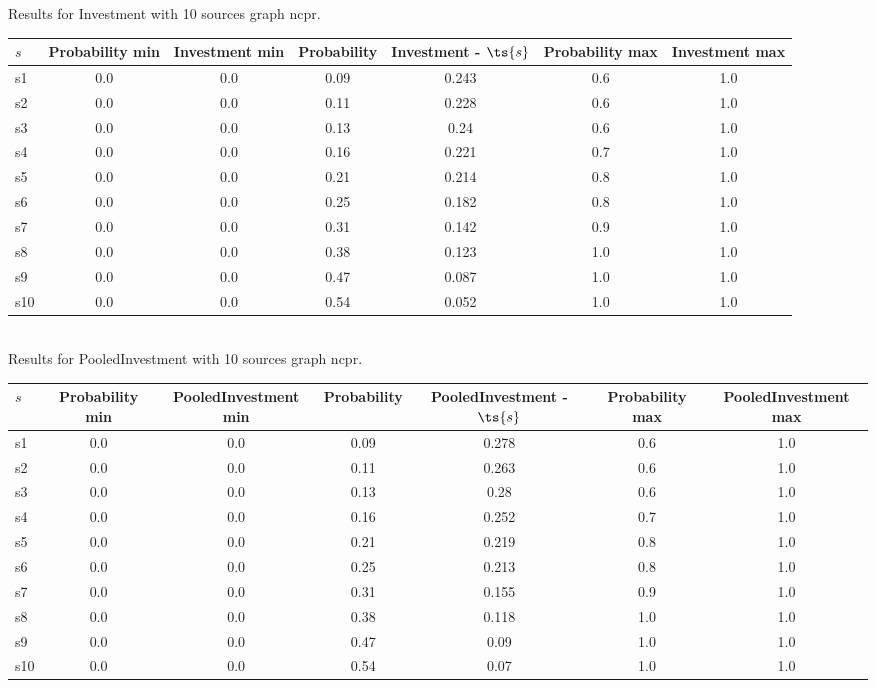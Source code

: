 \documentclass{article}
\begin{document}
\noindent Results for Investment with 10 sources graph ncpr.

\noindent\begin{tabular}{|l|c|c|c|c|c|c|}
\hline
$s$& Probability min & Investment min & Probability & Investment - $\ts{s}$ & Probability max & Investment max\\
\hline
s1 &0.0 & 0.0 & 0.09 & 0.243 & 0.6 & 1.0\\
\hline
s2 &0.0 & 0.0 & 0.11 & 0.228 & 0.6 & 1.0\\
\hline
s3 &0.0 & 0.0 & 0.13 & 0.24 & 0.6 & 1.0\\
\hline
s4 &0.0 & 0.0 & 0.16 & 0.221 & 0.7 & 1.0\\
\hline
s5 &0.0 & 0.0 & 0.21 & 0.214 & 0.8 & 1.0\\
\hline
s6 &0.0 & 0.0 & 0.25 & 0.182 & 0.8 & 1.0\\
\hline
s7 &0.0 & 0.0 & 0.31 & 0.142 & 0.9 & 1.0\\
\hline
s8 &0.0 & 0.0 & 0.38 & 0.123 & 1.0 & 1.0\\
\hline
s9 &0.0 & 0.0 & 0.47 & 0.087 & 1.0 & 1.0\\
\hline
s10 &0.0 & 0.0 & 0.54 & 0.052 & 1.0 & 1.0\\
\hline
\end{tabular}\\

\noindent Results for PooledInvestment with 10 sources graph ncpr.

\noindent\begin{tabular}{|l|c|c|c|c|c|c|}
\hline
$s$& Probability min & PooledInvestment min & Probability & PooledInvestment - $\ts{s}$ & Probability max & PooledInvestment max\\
\hline
s1 &0.0 & 0.0 & 0.09 & 0.278 & 0.6 & 1.0\\
\hline
s2 &0.0 & 0.0 & 0.11 & 0.263 & 0.6 & 1.0\\
\hline
s3 &0.0 & 0.0 & 0.13 & 0.28 & 0.6 & 1.0\\
\hline
s4 &0.0 & 0.0 & 0.16 & 0.252 & 0.7 & 1.0\\
\hline
s5 &0.0 & 0.0 & 0.21 & 0.219 & 0.8 & 1.0\\
\hline
s6 &0.0 & 0.0 & 0.25 & 0.213 & 0.8 & 1.0\\
\hline
s7 &0.0 & 0.0 & 0.31 & 0.155 & 0.9 & 1.0\\
\hline
s8 &0.0 & 0.0 & 0.38 & 0.118 & 1.0 & 1.0\\
\hline
s9 &0.0 & 0.0 & 0.47 & 0.09 & 1.0 & 1.0\\
\hline
s10 &0.0 & 0.0 & 0.54 & 0.07 & 1.0 & 1.0\\
\hline
\end{tabular}\\
\end{document}
